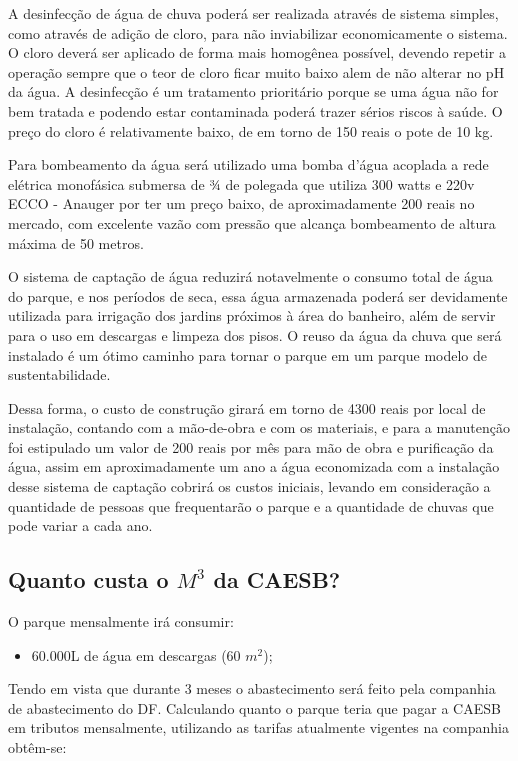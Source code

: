 A desinfecção de água de chuva poderá ser realizada através de sistema simples, como através de adição de cloro, para não inviabilizar economicamente o sistema. O cloro deverá ser aplicado de forma mais homogênea possível, devendo repetir a operação sempre que o teor de cloro ficar muito baixo alem de não alterar no pH da água. A desinfecção é um tratamento prioritário porque se uma água não for bem tratada e podendo estar contaminada poderá trazer sérios riscos à saúde. O preço do cloro é relativamente baixo, de em torno de 150 reais o pote de 10 kg.

Para bombeamento da água será utilizado uma bomba d’água acoplada a rede elétrica monofásica submersa de ¾ de polegada que utiliza 300 watts e 220v ECCO - Anauger por ter um preço baixo, de aproximadamente 200 reais no mercado, com excelente vazão com pressão que alcança bombeamento de altura máxima de 50 metros.

O sistema de captação de água reduzirá notavelmente o consumo total de água do parque, e nos períodos de seca, essa água armazenada poderá ser devidamente utilizada para irrigação dos jardins próximos à área do banheiro, além de servir para o uso em descargas e limpeza dos pisos. O reuso da água da chuva que será instalado é um ótimo caminho para tornar o parque em um parque modelo de sustentabilidade.

Dessa forma, o custo de construção girará em torno de 4300 reais por local de instalação, contando com a mão-de-obra e com os materiais, e para a manutenção foi estipulado um valor de 200 reais por mês para mão de obra e purificação da água, assim em aproximadamente um ano a água economizada com a instalação desse sistema de captação cobrirá os custos iniciais, levando em consideração a quantidade de pessoas que frequentarão o parque e a quantidade de chuvas que pode variar a cada ano.

\subsection{Quanto custa o $M^{3}$ da CAESB?}

O parque mensalmente irá consumir:
\begin{itemize}
	\item 60.000L de água em descargas (60 $m^{2}$);
\end{itemize}

	
	Tendo em vista que durante 3 meses o abastecimento será feito pela companhia de abastecimento do DF. Calculando quanto o parque teria que pagar a CAESB em tributos mensalmente, utilizando as tarifas atualmente vigentes na companhia obtêm-se: 
	
